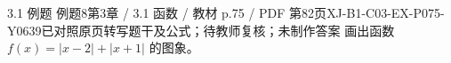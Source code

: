\par\noindent\begin{minipage}{\linewidth}
\begin{bankitem}{3.1 例题 例题8}{第3章 / 3.1 函数 / 教材 p.75 / PDF 第82页}{XJ-B1-C03-EX-P075-Y0639}{已对照原页转写题干及公式；待教师复核；未制作答案}
画出函数 $f(x)=|x-2|+|x+1|$ 的图象。
\end{bankitem}
\end{minipage}\par\medskip
